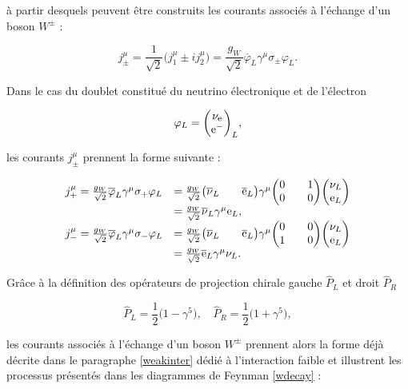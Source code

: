     à partir desquels peuvent être construits les courants associés à l'échange d'un boson $W^{\pm}$ :

    \begin{equation}
    \boxed{
        j^{\mu}_{\pm}=\frac{1}{\sqrt{2}}\bigl(j_1^\mu\pm ij^\mu_2\bigr)=\frac{g_W}{\sqrt{2}}\overline{\varphi}_L\gamma^\mu \sigma_{\pm}\varphi_L.
    }
    \label{Wexchange}
    \end{equation}

    Dans le cas du doublet constitué du neutrino électronique et de l'électron 

    \begin{equation*}
        \varphi_L=\mqty(\nu_{\mbox{\footnotesize e}} \\ \mbox{e}^-)_L,
    \end{equation*}

    les courants $j^{\mu}_{\pm}$ prennent la forme suivante :

    \begin{equation*}
    \begin{array}{ll}
        j^\mu_+ = \frac{g_W}{\sqrt{2}}\overline{\varphi}_L\gamma^{\mu}\sigma_+\varphi_L & = \frac{g_W}{\sqrt{2}}\mqty(\overline{\nu}_L&&\overline{\mbox{e}}_L)\gamma^\mu\mqty(0&&1\\0&&0)\mqty(\nu_L\\\mbox{e}_L) \\
        & = \frac{g_W}{\sqrt{2}}\overline{\nu}_L\gamma^{\mu}\mbox{e}_L, \\
        j^\mu_- = \frac{g_W}{\sqrt{2}}\overline{\varphi}_L\gamma^{\mu}\sigma_-\varphi_L & = \frac{g_W}{\sqrt{2}}\mqty(\overline{\nu}_L&&\overline{\mbox{e}}_L)\gamma^\mu\mqty(0&&0\\1&&0)\mqty(\nu_L\\\mbox{e}_L) \\
        & = \frac{g_W}{\sqrt{2}}\overline{\mbox{e}}_L\gamma^{\mu}\nu_L. \\
    \end{array}
    \end{equation*}

    Grâce à la définition des opérateurs de projection chirale gauche $\hat{P}_L$ et droit $\hat{P}_R$ 
    
    $$\hat{P}_L=\frac{1}{2}\bigl(1-\gamma^5\bigr), \quad \hat{P}_R=\frac{1}{2}\bigl(1+\gamma^5\bigr),$$
    
    les courants associés à l'échange d'un boson $W^{\pm}$ prennent alors la forme déjà décrite dans le paragraphe \ref{weakinter} dédié à l'interaction faible et illustrent les processus présentés dans les diagrammes de Feynman \ref{wdecay} :

